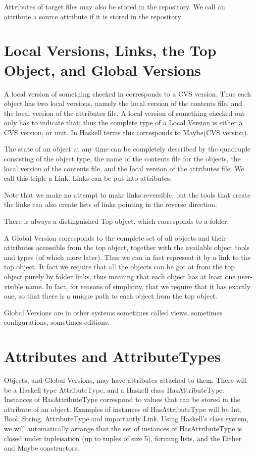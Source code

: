 \documentclass[a4paper]{article}
\begin{document}
Attributes of target files may also be stored in the repository.  We
call an attribute a source attribute if it is stored in the repository

\section{Local Versions, Links, the Top Object, and  Global Versions}
A local version of something checked in corresponds to a CVS version.
Thus each object has two local versions, namely the local version of the 
contents file, and the local version of the attributes file.
A local version of something checked out only has to indicate that;
thus the complete type of a Local Version is either a CVS version, or
unit.  In Haskell terms this corresponds to Maybe(CVS version).

The state of an object at any time can be completely described by the
quadruple consisting of the object type, the name of the contents file 
for the objects, the local version of the contents file, and the local 
version of the attributes file. We call this triple a Link.  Links can be
put into attributes.

Note that we make no attempt to make links reversible, but the tools
that create the links can also create lists of links pointing in the
reverse direction.

There is always a distinguished Top object, which corresponds to a folder.

A Global Version corresponds to the complete set of all objects and their
attributes accessible from the top object, together with the available object
tools and types (of which more later).  Thus we can in fact represent
it by a link to the top object.  It fact we require that all the objects
can be got at from the top object purely by folder links, thus meaning that
each object has at least one user-visible name.  In fact, for reasons of
simplicity, that we require that it has exactly one, so that there is
a unique path to each object from the top object.

Global Versions are in other systems sometimes called views, sometimes
configurations, sometimes editions.

\section{Attributes and AttributeTypes}
Objects, and Global Versions, may have attributes attached to them.
There will be a Haskell type AttributeType, and a Haskell class
HasAttributeType.  Instances of HasAttributeType correspond to values
that can be stored in the attribute of an object.  Examples of
instances of HasAttributeType will be Int, Bool, String, AttributeType
and importantly Link.  Using Haskell's class system, we will automatically 
arrange that the set of instances  of HasAttributeType is closed under 
tupleisation (up to tuples of size 5), forming lists, and the Either and Maybe 
constructors.
\end{document}
